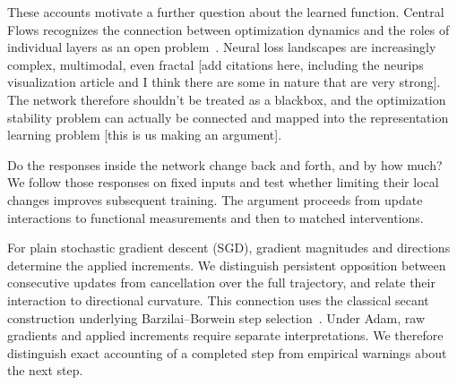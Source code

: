 These accounts motivate a further question about the learned function. Central Flows recognizes the connection between optimization dynamics and the roles of individual layers as an open problem~\cite{cohen2025central}. Neural loss landscapes are increasingly complex, multimodal, even fractal [add citations here, including the neurips visualization article and I think there are some in nature that are very strong]. The network therefore shouldn't be treated as a blackbox, and the optimization stability problem can actually be connected and mapped into the representation learning problem [this is us making an argument].

Do the responses inside the network change back and forth, and by how much? We follow those responses on fixed inputs and test whether limiting their local changes improves subsequent training. The argument proceeds from update interactions to functional measurements and then to matched interventions.

For plain stochastic gradient descent (SGD), gradient magnitudes and directions determine the applied increments. We distinguish persistent opposition between consecutive updates from cancellation over the full trajectory, and relate their interaction to directional curvature. This connection uses the classical secant construction underlying Barzilai--Borwein step selection~\cite{barzilai1988two,tan2016bbsgd}. Under Adam, raw gradients and applied increments require separate interpretations. We therefore distinguish exact accounting of a completed step from empirical warnings about the next step.

